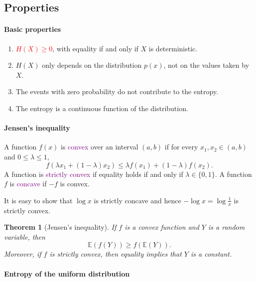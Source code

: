 \documentclass[a4paper, 11pt, openany]{book}
\numberwithin{equation}{section}
\theoremstyle{plain}
\newtheorem{theorem}	[equation]	{Theorem}
\theoremstyle{definition}
\newcommand{\expectation}{\mathbb{E}}
\newcommand{\Important}[1]{\textcolor{red}{#1}}
\newcommand{\Define}[1]{\textcolor{purple}{#1}}
\begin{document}
\subsection{Properties}

\paragraph{Basic properties}

\begin{enumerate}
	\item \Important{$H(X) \ge 0$}, with equality if and only if $X$ is deterministic.
	
	\item $H(X)$ only depends on the distribution $p(x)$, not on the values taken by $X$.
	
	\item The events with zero probability do not contribute to the entropy.
	
	\item The entropy is a continuous function of the distribution.
\end{enumerate}









\paragraph{Jensen's inequality}

A function $f(x)$ is \Define{convex} over an interval $(a,b)$ if for every $x_1, x_2 \in (a,b)$ and $0 \le \lambda \le 1$, 
\[
	f(\lambda x_1 + (1- \lambda) x_2) \le \lambda f(x_1) + (1- \lambda) f(x_2).
\]
A function is \Define{strictly convex} if equality holds if and only if $\lambda \in \{0,1\}$. A function $f$ is \Define{concave} if $-f$ is convex.

It is easy to show that $\log x$ is strictly concave and hence $-\log x = \log \frac{1}{x}$ is strictly convex.

\begin{theorem}[Jensen's inequality]
If $f$ is a convex function and $Y$ is a random variable, then
\[
	\expectation ( f(Y) ) \ge f( \expectation( Y ) ).
\]
Moreover, if $f$ is strictly convex, then equality implies that $Y$ is a constant.
\end{theorem}



\paragraph{Entropy of the uniform distribution}
\end{document}
